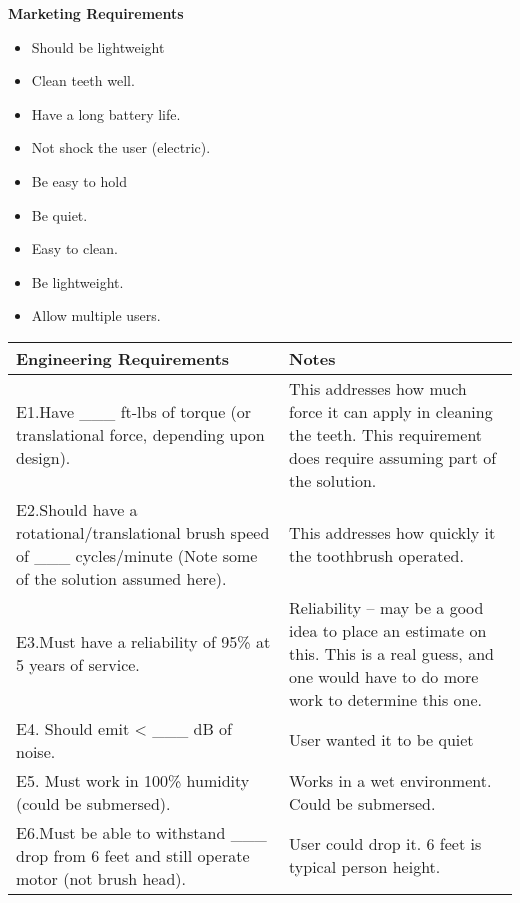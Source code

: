 \begin{enumerate}
\begin{onlysolution}
 \textbf{Marketing Requirements}
\begin{itemize}
\item Should be lightweight
\item Clean teeth well.
\item Have a long battery life.
\item Not shock the user (electric).
\item Be easy to hold
\item Be quiet.
\item Easy to clean.
\item Be lightweight.
\item Allow multiple users.
\end{itemize} 

\begin{tabular}{l|l}
Engineering Requirements & Notes \\ \hline


E1.Have \_\_\_ ft-lbs of torque (or translational force, depending upon design). &
This addresses how much force it can apply in cleaning the teeth. This
requirement does require assuming part of the solution.	\\ \hline

E2.Should have a rotational/translational brush speed of \_\_\_
cycles/minute (Note some of the solution assumed here). &
This addresses how quickly it the toothbrush operated.				\\ \hline

E3.Must have a reliability of 95\% at 5 years of service. &
Reliability -- may be a good idea to place an estimate on this. This is
a real guess, and one would have to do more work to determine this one.	\\ \hline

E4. Should emit \textless{} \_\_\_ dB of noise. &
User wanted it to be quiet						 \\ \hline


E5. Must work in 100\% humidity (could be submersed). &
Works in a wet environment. Could be submersed.		 \\ \hline

E6.Must be able to withstand \_\_\_ drop from 6 feet and still operate
motor (not brush head). &
User could drop it. 6 feet is typical person height.		\\ \hline


\end{tabular}
\end{onlysolution}
\end{enumerate}
